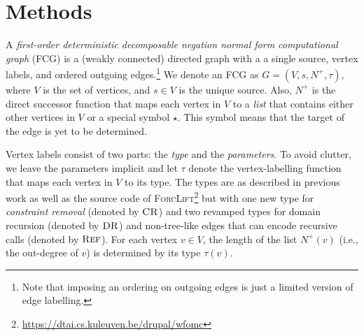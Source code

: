 \section{Methods}


A \emph{first-order deterministic decomposable negation normal form computational graph} (FCG) is a (weakly connected) directed graph with a a single source, vertex labels, and ordered outgoing edges.\footnote{Note that imposing an ordering on outgoing edges is just a limited version of edge labelling.} We denote an FCG as $G = (V, s, N^+, \tau)$, where $V$ is the set of vertices, and $s \in V$ is the unique source. Also, $N^+$ is the direct successor function that maps each vertex in $V$ to a \emph{list} that contains either other vertices in $V$ or a special symbol $\star$. This symbol means that the target of the edge is yet to be determined.


Vertex labels consist of two parts: the \emph{type} and the \emph{parameters}. To avoid clutter, we leave the parameters implicit and let $\tau$ denote the vertex-labelling function that maps each vertex in $V$ to its type. The types are as described in previous work \citep{DBLP:conf/nips/Broeck11,DBLP:conf/ijcai/BroeckTMDR11} as well as the source code of \textsc{ForcLift}\footnote{\url{https://dtai.cs.kuleuven.be/drupal/wfomc}} but with one new type for \emph{constraint removal} (denoted by $\operatorname{\textsc{CR}}$) and two revamped types for domain recursion (denoted by $\operatorname{\textsc{DR}}$) and non-tree-like edges that can encode recursive calls (denoted by $\operatorname{\textsc{Ref}}$). For each vertex $v \in V$, the length of the list $N^+(v)$ (i.e., the out-degree of $v$) is determined by its type $\tau(v)$.

